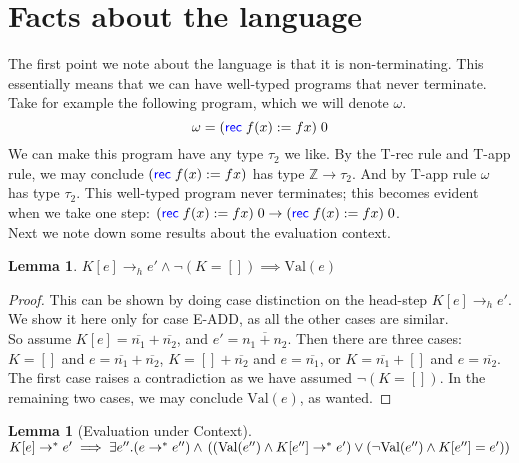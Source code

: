 \documentclass[twoside,11pt,openright]{report}
\newtheorem{lemma}[theorem]{Lemma}
\theoremstyle{definition}
\newcommand{\expr}{e}
\newcommand{\Num}[1]{\overline{#1}}
\newcommand{\empelctx}{[]}
\newcommand{\elctx}{K}
\newcommand{\Tint}{\mathbb{Z}}
\newcommand{\Tfunc}[2]{#1 \rightarrow #2}
\newcommand{\typ}{\tau}
\newcommand{\step}{\rightarrow}
\newcommand{\stepS}{\rightarrow^*}
\newcommand{\hstep}{\rightarrow_h}
\newcommand{\Val}[1]{\mathrm{Val}(#1)}
\begin{document}
\section{Facts about the language}
The first point we note about the language is that it is non-terminating. This essentially means that we can have well-typed programs that never terminate. Take for example the following program, which we will denote $\omega$.
\begin{equation*}
  \omega = (\Rec f x := f x) \; 0
\end{equation*}
We can make this program have any type $\typ_2$ we like. By the T-rec rule and T-app rule, we may conclude $(\Rec f x := f x)$ has type $\Tfunc{\Tint}{\typ_2}$. And by T-app rule $\omega$ has type $\tau_2$. This well-typed program never terminates; this becomes evident when we take one step: $(\Rec f x := f x) \; 0 \step (\Rec f x := f x) \; 0$.\bigskip\\
Next we note down some results about the evaluation context.
\begin{lemma}\label{lem:headstep_val}
  $\elctx[\expr] \hstep \expr' \land \neg (\elctx = \empelctx) \implies \Val{e}$
\end{lemma}
\begin{proof}
  This can be shown by doing case distinction on the head-step $\elctx[\expr] \hstep \expr'$. We show it here only for case E-ADD, as all the other cases are similar. \medskip\\
  So assume $\elctx[\expr] = \Num{n_1} + \Num{n_2}$, and $\expr' = \Num{n_1 + n_2}$.
  Then there are three cases: $\elctx = []$ and $\expr = \Num{n_1} + \Num{n_2}$, $\elctx = [] + \Num{n_2}$ and $\expr = \Num{n_1}$, or $\elctx = \Num{n_1} + []$ and $\expr = \Num{n_2}$. The first case raises a contradiction as we have assumed $\neg (\elctx = \empelctx)$. In the remaining two cases, we may conclude $\Val{\expr}$, as wanted.
\end{proof}


\begin{lemma}[Evaluation under Context]\label{lem:EuC}
  $ \elctx[\expr] \stepS \expr' \implies 
    \exists \expr'' . (\expr \stepS \expr'') \land\\
    \left( (\Val{\expr''} \land \elctx[\expr''] \stepS \expr') \lor
    (\neg \Val{\expr''} \land \elctx[\expr''] = \expr') \right)
    $
\end{lemma}
\end{document}
